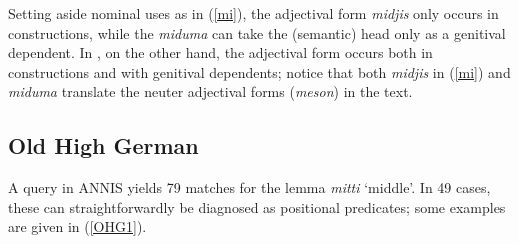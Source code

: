 \documentclass[output=paper,colorlinks,citecolor=brown]{langscibook}
\begin{document}
Setting aside nominal uses as in (\ref{mi}), the adjectival form \textit{midjis} only occurs in  constructions, while the  \textit{miduma} can  take  the (semantic) head  only as a genitival dependent. In , on the other hand, the adjectival form occurs both in  constructions and with genitival dependents; notice that both \textit{midjis} in (\ref{mi}) and \textit{miduma}  translate the  neuter adjectival forms (\textit{meson}) in the  text. 









\subsection{Old High German}


A query  in ANNIS  yields 79 matches for the lemma \textit{mitti} `middle'. In 49 cases, these can straightforwardly be diagnosed as positional predicates; some examples are given in (\ref{OHG1}).
\end{document}
